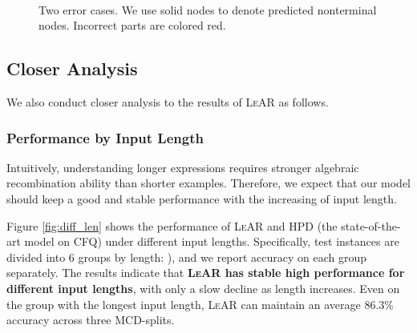 \documentclass[11pt,a4paper]{article}
\begin{document}
\begin{figure}[tp]
  \centering
  
  
   \\
  
  \caption{Two error cases. We use solid nodes to denote predicted nonterminal nodes. Incorrect parts are colored red.}\label{fig:err_type} 
  
\end{figure}

\subsection{Closer Analysis}

We also conduct closer analysis to the results of \textsc{LeAR} as follows.

\subsubsection{Performance by Input Length}

Intuitively, understanding longer expressions requires stronger algebraic recombination ability than shorter examples.
Therefore, we expect that our model should keep a good and stable performance with the increasing of input length.



Figure \ref{fig:diff_len} shows the performance of \textsc{LeAR} and \textsc{HPD} (the state-of-the-art model on CFQ) under different input lengths.
Specifically, test instances are divided into 6 groups by length: ), and we report accuracy on each group separately.
The results indicate that \textbf{\textsc{LeAR} has stable high performance for different input lengths}, with only a slow decline as length increases.
Even on the group with the longest input length, \textsc{LeAR} can maintain an average 86.3\% accuracy across three MCD-splits.
\end{document}
